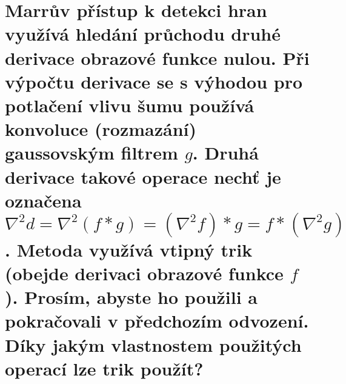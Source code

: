 \section{Marrův přístup k detekci hran využívá hledání průchodu druhé derivace obrazové funkce nulou. Při výpočtu 
derivace se s výhodou pro potlačení vlivu šumu používá konvoluce (rozmazání) gaussovským filtrem $g$. Druhá derivace 
takové operace nechť je označena $\nabla^{2}d = \nabla^{2}(f*g) = (\nabla^{2}f)*g = f*(\nabla^{2}g)$. Metoda využívá 
vtipný trik (obejde derivaci obrazové funkce $f$). Prosím, abyste ho použili a pokračovali v předchozím odvození. Díky 
jakým vlastnostem použitých operací lze trik použít?}